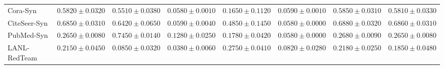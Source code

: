 \documentclass[applsci,article,submit,moreauthors,pdftex]{Definitions/mdpi}
\begin{document}
\begin{table}[H]
\begin{tabular*}{\textwidth}{@{\extracolsep{\fill}}lrrrrrrr}
Cora-Syn & $0.5820 \pm 0.0320$ & $0.5510 \pm 0.0380$ & $0.0580 \pm 0.0010$ & $0.1650 \pm 0.1120$ & $0.0590 \pm 0.0010$ & $\mathbf{0.5850 \pm 0.0310}$ & $0.5810 \pm 0.0330$ \\
CiteSeer-Syn & $0.6850 \pm 0.0310$ & $0.6420 \pm 0.0650$ & $0.0590 \pm 0.0040$ & $0.4850 \pm 0.1450$ & $0.0580 \pm 0.0000$ & $\mathbf{0.6880 \pm 0.0320}$ & $0.6860 \pm 0.0310$ \\
PubMed-Syn & $0.2650 \pm 0.0080$ & $\mathbf{0.7450 \pm 0.0140}$ & $0.1280 \pm 0.0250$ & $0.1780 \pm 0.0420$ & $0.0580 \pm 0.0000$ & $0.2680 \pm 0.0090$ & $0.2650 \pm 0.0080$ \\\midrule
LANL-RedTeam & $0.2150 \pm 0.0450$ & $0.0850 \pm 0.0320$ & $0.0380 \pm 0.0060$ & $\mathbf{0.2750 \pm 0.0410}$ & $0.0820 \pm 0.0280$ & $0.2180 \pm 0.0250$ & $0.1850 \pm 0.0480$ \\\bottomrule
\end{tabular*}
\end{table}
\end{document}
